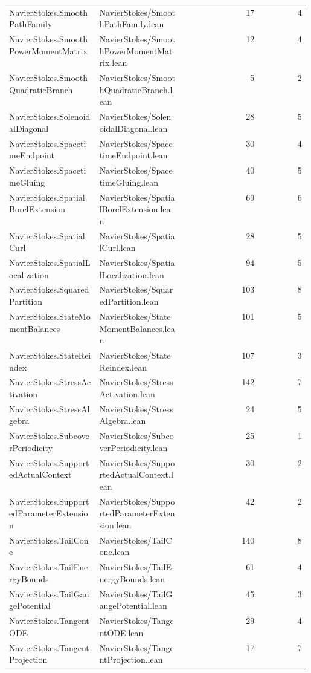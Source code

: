 \begin{longtable}{p{0.30\linewidth}p{0.28\linewidth}rr}
NavierStokes.SmoothPathFamily & NavierStokes/SmoothPathFamily.lean & 17 & 4\\
NavierStokes.SmoothPowerMomentMatrix & NavierStokes/SmoothPowerMomentMatrix.lean & 12 & 4\\
NavierStokes.SmoothQuadraticBranch & NavierStokes/SmoothQuadraticBranch.lean & 5 & 2\\
NavierStokes.SolenoidalDiagonal & NavierStokes/SolenoidalDiagonal.lean & 28 & 5\\
NavierStokes.SpacetimeEndpoint & NavierStokes/SpacetimeEndpoint.lean & 30 & 4\\
NavierStokes.SpacetimeGluing & NavierStokes/SpacetimeGluing.lean & 40 & 5\\
NavierStokes.SpatialBorelExtension & NavierStokes/SpatialBorelExtension.lean & 69 & 6\\
NavierStokes.SpatialCurl & NavierStokes/SpatialCurl.lean & 28 & 5\\
NavierStokes.SpatialLocalization & NavierStokes/SpatialLocalization.lean & 94 & 5\\
NavierStokes.SquaredPartition & NavierStokes/SquaredPartition.lean & 103 & 8\\
NavierStokes.StateMomentBalances & NavierStokes/StateMomentBalances.lean & 101 & 5\\
NavierStokes.StateReindex & NavierStokes/StateReindex.lean & 107 & 3\\
NavierStokes.StressActivation & NavierStokes/StressActivation.lean & 142 & 7\\
NavierStokes.StressAlgebra & NavierStokes/StressAlgebra.lean & 24 & 5\\
NavierStokes.SubcoverPeriodicity & NavierStokes/SubcoverPeriodicity.lean & 25 & 1\\
NavierStokes.SupportedActualContext & NavierStokes/SupportedActualContext.lean & 30 & 2\\
NavierStokes.SupportedParameterExtension & NavierStokes/SupportedParameterExtension.lean & 42 & 2\\
NavierStokes.TailCone & NavierStokes/TailCone.lean & 140 & 8\\
NavierStokes.TailEnergyBounds & NavierStokes/TailEnergyBounds.lean & 61 & 4\\
NavierStokes.TailGaugePotential & NavierStokes/TailGaugePotential.lean & 45 & 3\\
NavierStokes.TangentODE & NavierStokes/TangentODE.lean & 29 & 4\\
NavierStokes.TangentProjection & NavierStokes/TangentProjection.lean & 17 & 7\\

\end{longtable}

